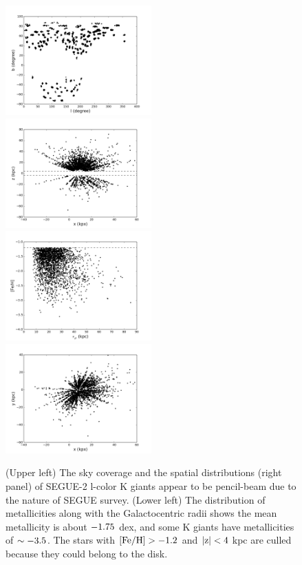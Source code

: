 \documentclass[12pt,preprint]{aastex}
\newcommand{\feh}{{\rm [Fe/H]}}
\begin{document}
\begin{figure}
\includegraphics[width=0.5\textwidth,height=0.3\textheight]{skymap_lkg}
\includegraphics[width=0.5\textwidth,height=0.3\textheight]{xz_lkg}
\includegraphics[width=0.5\textwidth,height=0.3\textheight]{rgcfeh_lkg}
\includegraphics[width=0.5\textwidth,height=0.3\textheight]{xy_lkg}

\caption{(Upper left) The sky coverage and the spatial distributions (right panel) of SEGUE-2 l-color K giants appear to be pencil-beam due to the nature of SEGUE survey. (Lower left) The distribution of metallicities along with the Galactocentric radii shows the mean metallicity is about $\rm -1.75~$dex, and some K giants have metallicities of $\rm \sim -3.5$. The stars with $\rm \feh>-1.2$ and $\rm |z|<4~$kpc are culled because they could belong to the disk.}
\label{f:fkgdistribution}
\end{figure}
\end{document}
